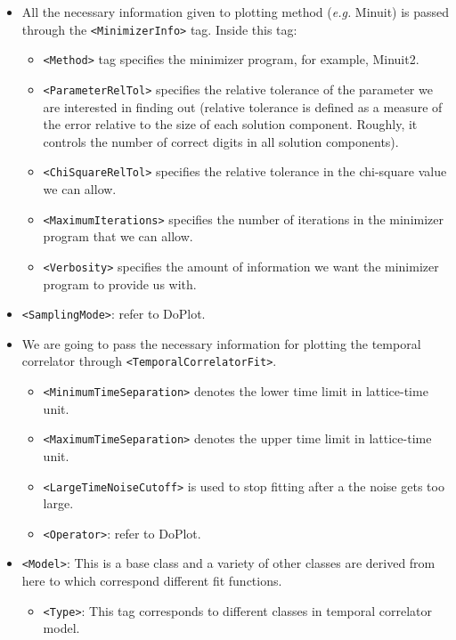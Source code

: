 \documentclass[12pt]{article}
\newcommand{\vb}{\texttt}
\begin{document}
\begin{itemize}
\item All the necessary information given to plotting method (\textit{e.g.} Minuit)
is passed through the \vb{<MinimizerInfo>} tag. Inside this tag:
\begin{itemize}
\item \vb{<Method>} tag specifies the minimizer program, for example, Minuit2.
\item \vb{<ParameterRelTol>} specifies the relative tolerance of the parameter we are interested in finding out (relative tolerance is defined as a measure of the error relative to the size of each solution component. Roughly, it controls the number of correct digits in all solution components).
\item \vb{<ChiSquareRelTol>} specifies the relative tolerance in the chi-square value we can allow.
\item \vb{<MaximumIterations>} specifies the number of iterations in the minimizer program that we can allow.
\item \vb{<Verbosity>} specifies the amount of information we want the minimizer program to provide us with.
\end{itemize}
\item \vb{<SamplingMode>}: refer to DoPlot.
\item We are going to pass the necessary information for plotting the temporal correlator through \vb{<TemporalCorrelatorFit>}.
\begin{itemize}
\item \vb{<MinimumTimeSeparation>} denotes  the lower time limit in lattice-time unit.
\item \vb{<MaximumTimeSeparation>} denotes the upper time limit in lattice-time unit.
\item \vb{<LargeTimeNoiseCutoff>} is used to stop fitting after a the noise gets too large.
\item \vb{<Operator>}: refer to DoPlot.
\end{itemize}
\item \vb{<Model>}: This is a base class and a variety of other classes are derived from here to which correspond different fit functions.
\begin{itemize}
\item \vb{<Type>}: This tag corresponds to different classes in temporal correlator model.
\end{itemize}
\end{itemize}
\end{document}
